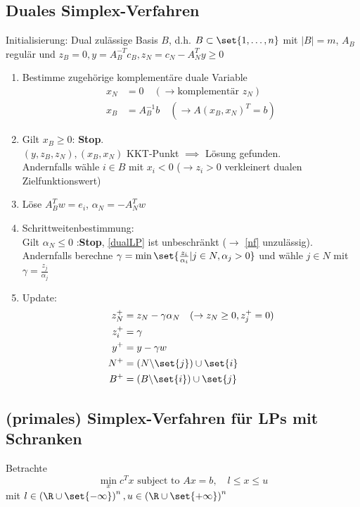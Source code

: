 \subsection{Duales Simplex-Verfahren}
Initialisierung: Dual zulässige Basis $B$, d.h. $B \subset \set{1,\dots ,n }$ mit $|B|=m$, $A_{B}$ regulär und $z_{B}=0,y=A_{B}^{-T}c_{B}, z_{N}= c_{N}-A_{N}^{T}y \geq 0$
\begin{enumerate}%
	\item Bestimme zugehörige komplementäre duale Variable
		\begin{align*}
			x_{N}&=0 \quad (\to \text{komplementär }z_{N})\\
			x_{B}&= A_{B}^{-1} b\quad ( \to A(x_{B},x_{N})^{T} =b)
		\end{align*}
	\item Gilt $x_{B} \geq 0 $: \textbf{Stop}.\\
		$(y,z_{B},z_{N}),(x_{B},x_{N})$ KKT-Punkt $\implies$ Lösung gefunden.\\
		Andernfalls wähle $ i \in B$ mit $x_{i}<0$ ($\to z_{i}>0$ verkleinert dualen Zielfunktionswert)
	\item Löse $A_{B}^{T} w = e_{i}$, $\alpha_{N} = -A_{N}^{T} w$
	\item Schrittweitenbestimmung:\\
    Gilt $\alpha_{N} \leq 0 $ :\textbf{Stop}, \eqref{dualLP} ist unbeschränkt ($\to$ \eqref{nf} unzulässig).\\
		Andernfalls berechne $\gamma = \min \set{ \frac{z_{i}}{\alpha_{i}}|j \in N , \alpha_{j} >0 }$ und wähle $j \in N$ mit $\gamma = \frac{z_{j}}{\alpha_{j}}$
	\item Update:
		\begin{align*}
			z_{N}^+ &= z_{N} - \gamma \alpha_{N} \quad (\to z_{N} \geq 0, z_{j}^+ =0)\\
			z_{i}^+ &= \gamma\\
			y^+ &= y -\gamma w\\
			N^+ &= (N \backslash \set{ j }) \cup \set{ i }\\
			B^+ &= (B \backslash \set{ i }) \cup \set{ j }
		\end{align*}
\end{enumerate}

\subsection{(primales) Simplex-Verfahren für LPs mit Schranken}
Betrachte
\begin{equation*}
	\min_{x} c^{T} x \text{ subject to } Ax = b ,\quad l \leq x \leq u
\end{equation*}
mit $l \in \left(\R \cup \set{ - \infty } \right)^n,u \in \left(\R \cup \set{ +\infty } \right)^n $

